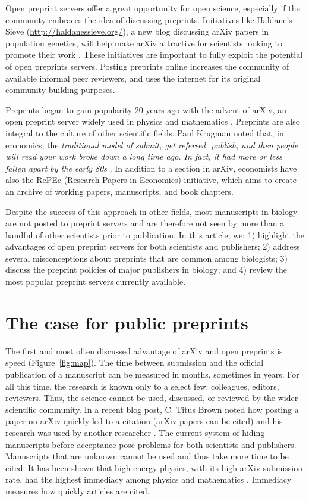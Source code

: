 \documentclass[letterpaper,twocolumn,superscriptaddress,showkeys,longbibliography]{revtex4-1}
\begin{document}
Open preprint servers offer a great opportunity for open science, especially if
the community embraces the idea of discussing preprints. Initiatives like
Haldane's Sieve (\href{http://haldanessieve.org/}{http://haldanessieve.org/}), a
new blog discussing arXiv papers in population genetics, will help make arXiv
attractive for scientists looking to promote their work \cite{lom12}. These initiatives are
important to fully exploit the potential of open preprints servers. Posting
preprints online increases the community of available informal peer reviewers,
and uses the internet for its original community-building purposes.

Preprints began to gain popularity 20 years ago with the advent of arXiv, an open
preprint server widely used in physics and mathematics \cite{gin11}. Preprints
are also integral to the culture of other scientific fields.  Paul Krugman noted
that, in economics, the \emph{traditional model of submit, get refereed,
publish, and then people will read your work broke down a long time ago. In
fact, it had more or less fallen apart by the early 80s} \cite{kru12}. In
addition to a section in arXiv, economists have also the RePEc (Research Papers
in Economics) initiative, which aims to create an archive of working papers,
manuscripts, and book chapters.

Despite the success of this approach in other fields, most manuscripts in
biology are not posted to preprint servers and are therefore not seen by more
than a handful of other scientists prior to publication. In this article, we: 1)
highlight the advantages of open preprint servers for both scientists and
publishers; 2) address several misconceptions about preprints that are common
among biologists; 3) discuss the preprint policies of major publishers in
biology; and 4) review the most popular preprint servers currently available.

\section{The case for public preprints}

The first and most often discussed advantage of arXiv and open preprints is
speed (Figure~\ref{fig:map}). The time between submission and the official
publication of a manuscript can be measured in months, sometimes in years. For
all this time, the research is known only to a select few: colleagues, editors,
reviewers. Thus, the science cannot be used, discussed, or reviewed by the wider
scientific community. In a recent blog post, C. Titus Brown noted how posting a
paper on arXiv quickly led to a citation (arXiv papers can be cited) and his
research was used by another researcher \cite{bro12}. The current system of
hiding manuscripts before acceptance pose problems for both scientists and
publishers. Manuscripts that are unknown cannot be used and thus take more time
to be cited. It has been shown that high-energy physics, with its high arXiv
submission rate, had the highest immediacy among physics and mathematics
\cite{pra05}. Immediacy measures how quickly articles are cited. 
\end{document}
